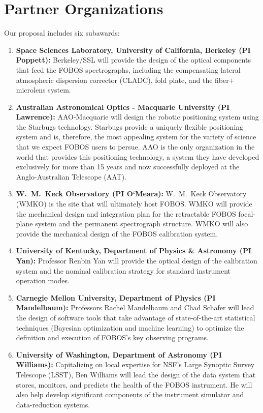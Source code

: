 \documentclass[oneside,11pt]{amsart}
\begin{document}


\vspace*{-1.5cm}

\section*{Partner Organizations}

\noindent Our proposal includes six subawards:
%
\begin{enumerate}
%
\item {\bf Space Sciences Laboratory, University of California, Berkeley
(PI Poppett):} Berkeley/SSL will provide the design of the optical
components that feed the FOBOS spectrographs, including the compensating
lateral atmospheric dispersion corrector (CLADC), fold plate, and the
fiber$+$microlens system.
%
\item {\bf Australian Astronomical Optics - Macquarie University (PI
Lawrence):} AAO-Macquarie will design the robotic positioning system
using the Starbugs technology.  Starbugs provide a uniquely flexible
positioning system and is, therefore, the most appealing system for the
variety of science that we expect FOBOS users to persue.  AAO is the
only organization in the world that provides this positioning
technology, a system they have developed exclusively for more than 15
years and now successfully deployed at the Anglo-Australian Telescope
(AAT).
%
\item {\bf W.~M.~Keck Observatory (PI O`Meara):} W.~M.~Keck Observatory
(WMKO) is the site that will ultimately host FOBOS. WMKO will provide
the mechanical design and integration plan for the retractable FOBOS
focal-plane system and the permanent spectrograph structure. WMKO will
also provide the mechanical design of the FOBOS calibration system.
%
\item {\bf University of Kentucky, Department of Physics \& Astronomy
(PI Yan):} Professor Renbin Yan will provide the optical design of the
calibration system and the nominal calibration strategy for standard
instrument operation modes.
%
\item {\bf Carnegie Mellon University, Department of Physics (PI
Mandelbaum):} Professors Rachel Mandelbaum and Chad Schafer will lead
the design of software tools that take advantage of state-of-the-art
statistical techniques (Bayesian optimization and machine learning) to
optimize the definition and execution of FOBOS's key observing programs.
%
\item {\bf University of Washington, Department of Astronomy (PI
Williams):} Capitalizing on local expertise for NSF's Large Synoptic
Survey Telescope (LSST), Ben Williams will lead the design of the data
system that stores, monitors, and predicts the health of the FOBOS
instrument. He will also help develop significant components of the
instrument simulator and data-reduction systems.
%
\end{enumerate}
\end{document}
